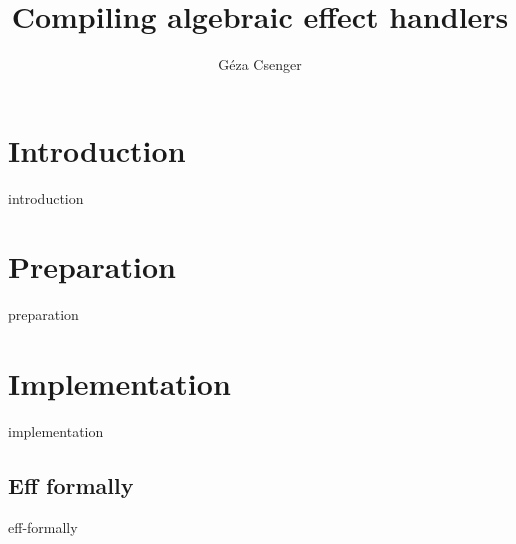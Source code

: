 \documentclass[oneside]{book}
\title{Compiling algebraic effect handlers}
\author{Géza Csenger}
\date{}
\begin{document}
\maketitle
\tableofcontents

\chapter{Introduction}
{introduction}

\chapter{Preparation}
{preparation}

\chapter{Implementation}
{implementation}

\begin{appendices}
    \chapter{Eff formally}
    {eff-formally}
\end{appendices}

{}

\end{document}
